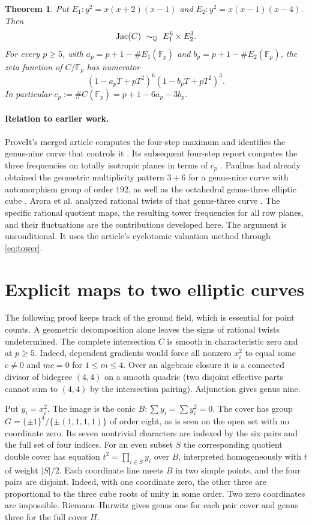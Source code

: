 \documentclass[11pt]{article}
\newtheorem{theorem}{Theorem}[section]
\newcommand{\F}{\mathbb F}\newcommand{\Q}{\mathbb Q}\newcommand{\PP}{\mathbb P}
\begin{document}
\begin{theorem}\label{th:curves}
Put $E_1:y^2=x(x+2)(x-1)$ and $E_2:y^2=x(x-1)(x-4)$. Then
\[
 \Jac(C)\ \sim_{\Q}\ E_1^6\times E_2^3 .
\]
For every $p\ge5$, with $a_p=p+1-\#E_1(\F_p)$ and
$b_p=p+1-\#E_2(\F_p)$, the zeta function of $C/\F_p$ has numerator
\[
 (1-a_pT+pT^2)^6(1-b_pT+pT^2)^3 .
\]
In particular $c_p:=\#C(\F_p)=p+1-6a_p-3b_p$.
\end{theorem}

\paragraph{Relation to earlier work.}
ProveIt's merged article computes the four-step maximum and identifies
the genus-nine curve that controls it \cite{article}. Its subsequent
four-step report computes the three frequencies on totally isotropic
planes in terms of $c_p$ \cite{short}. Paulhus had already obtained
the geometric multiplicity pattern $3+6$ for a genus-nine curve
with automorphism group of order $192$, as well as the octahedral
genus-three elliptic cube \cite[\S\S3.2.4, 4.2]{paulhus}.
Arora et al. analyzed rational twists of that genus-three curve
\cite{arora}. The specific rational quotient maps, the resulting
tower frequencies for all row planes, and their fluctuations are
the contributions developed here. The argument is unconditional.
It uses the article's cyclotomic valuation method through
\eqref{eq:tower}.

\section{Explicit maps to two elliptic curves}
The following proof keeps track of the ground field, which is essential
for point counts. A geometric decomposition alone leaves the signs of
rational twists undetermined. The complete intersection $C$ is smooth
in characteristic zero and at $p\ge5$. Indeed, dependent gradients
would force all nonzero $x_i^2$ to equal some $c\ne0$ and $mc=0$ for
$1\le m\le4$. Over an algebraic closure it is a connected divisor of
bidegree $(4,4)$ on a smooth quadric (two disjoint effective parts
cannot sum to $(4,4)$ by the intersection pairing). Adjunction gives
genus nine.

Put $y_i=x_i^2$. The image is the conic
$B:\sum y_i=\sum y_i^2=0$. The cover has group
$G=\{\pm1\}^4/\{\pm(1,1,1,1)\}$ of order eight, as is seen on the
open set with no coordinate zero. Its seven nontrivial characters
are indexed by the six pairs and the full set of four indices. For
an even subset $S$ the corresponding quotient double cover has
equation $t^2=\prod_{i\in S}y_i$ over $B$, interpreted homogeneously
with $t$ of weight $|S|/2$. Each coordinate line meets $B$ in two
simple points, and the four pairs are disjoint. Indeed, with one
coordinate zero, the other three are proportional to the three cube
roots of unity in some order. Two zero coordinates are impossible.
Riemann--Hurwitz gives genus one for each pair cover and genus three
for the full cover $H$.
\end{document}
